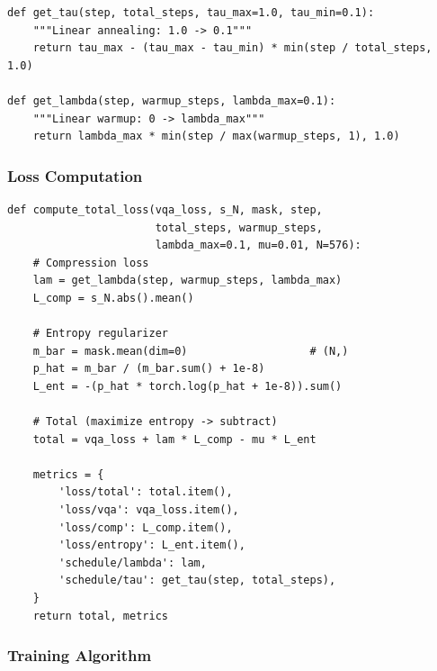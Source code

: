 \documentclass[11pt,a4paper]{article}
\begin{document}
\begin{lstlisting}[caption={Temperature and lambda schedules.}]
def get_tau(step, total_steps, tau_max=1.0, tau_min=0.1):
    """Linear annealing: 1.0 -> 0.1"""
    return tau_max - (tau_max - tau_min) * min(step / total_steps, 1.0)

def get_lambda(step, warmup_steps, lambda_max=0.1):
    """Linear warmup: 0 -> lambda_max"""
    return lambda_max * min(step / max(warmup_steps, 1), 1.0)
\end{lstlisting}

\subsubsection{Loss Computation}

\begin{lstlisting}[caption={Complete TC-ViTok loss function.}]
def compute_total_loss(vqa_loss, s_N, mask, step,
                       total_steps, warmup_steps,
                       lambda_max=0.1, mu=0.01, N=576):
    # Compression loss
    lam = get_lambda(step, warmup_steps, lambda_max)
    L_comp = s_N.abs().mean()

    # Entropy regularizer
    m_bar = mask.mean(dim=0)                   # (N,)
    p_hat = m_bar / (m_bar.sum() + 1e-8)
    L_ent = -(p_hat * torch.log(p_hat + 1e-8)).sum()

    # Total (maximize entropy -> subtract)
    total = vqa_loss + lam * L_comp - mu * L_ent

    metrics = {
        'loss/total': total.item(),
        'loss/vqa': vqa_loss.item(),
        'loss/comp': L_comp.item(),
        'loss/entropy': L_ent.item(),
        'schedule/lambda': lam,
        'schedule/tau': get_tau(step, total_steps),
    }
    return total, metrics
\end{lstlisting}

\subsubsection{Training Algorithm}
\end{document}

